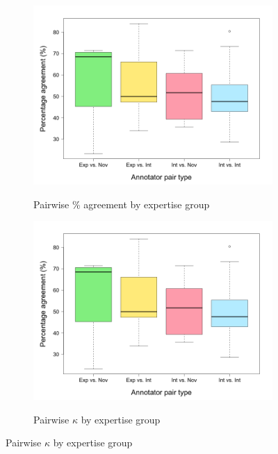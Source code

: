 		\begin{figure}[phtb]
			\centering
			
			
			\begin{subfigure}{\textwidth}
				\centering
				\caption{Pairwise \% agreement by expertise group}
				\includegraphics[width=.9\textwidth]{img/plots/pairwisePctByExpertise-noTitle}
				\label{fig:agreement:expertise:pct}
			\end{subfigure}%
			
			\vspace{1em}			
			
			\begin{subfigure}{\textwidth}
				\centering
				\caption{Pairwise $\kappa$ by expertise group}
				\includegraphics[width=.9\textwidth]{img/plots/pairwisePctByExpertise-noTitle}
				\label{fig:agreement:expertise:k}
			\end{subfigure}%
			

\end{figure}
